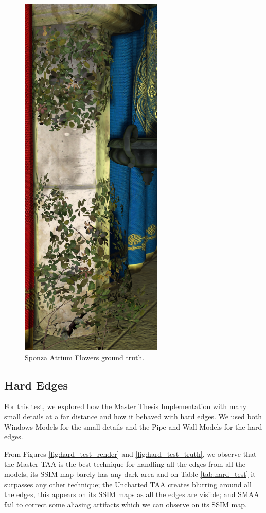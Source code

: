 \documentclass[pregrado]{tesis-usb} %
\begin{document}
\begin{figure}[H]
	\centering
	\includegraphics[scale=0.2]{images/results/sponza_flowers_sobel_ground_truth.png}
	\caption{Sponza Atrium Flowers ground truth.}\label{fig:sponza_flowers_truth}
\end{figure}

\subsection{Hard Edges}
For this test, we explored how the Master Thesis Implementation with many small details at a far distance and how it behaved with hard edges. We used both Windows Models for the small details and the Pipe and Wall Models for the hard edges. 

From Figures \ref{fig:hard_test_render} and \ref{fig:hard_test_truth}, we observe that the Master TAA is the best technique for handling all the edges from all the models, its SSIM map barely has any dark area and on Table \ref{tab:hard_test} it surpasses any other technique; the Uncharted TAA creates blurring around all the edges, this appears on its SSIM maps as all the edges are visible; and SMAA fail to correct some aliasing artifacts which we can observe on its SSIM map.
\end{document}
